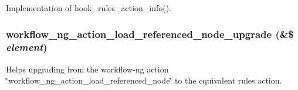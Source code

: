 Implementation of hook\_\-rules\_\-action\_\-info(). \hypertarget{nodereference_8rules_8inc_f1c8deb119cb0faed852ec676b4929c8}{
\subsubsection[{workflow\_\-ng\_\-action\_\-load\_\-referenced\_\-node\_\-upgrade}]{\setlength{\rightskip}{0pt plus 5cm}workflow\_\-ng\_\-action\_\-load\_\-referenced\_\-node\_\-upgrade (\&\$ {\em element})}}
\label{nodereference_8rules_8inc_f1c8deb119cb0faed852ec676b4929c8}


Helps upgrading from the workflow-ng action \char`\"{}workflow\_\-ng\_\-action\_\-load\_\-referenced\_\-node\char`\"{} to the equivalent rules action. 